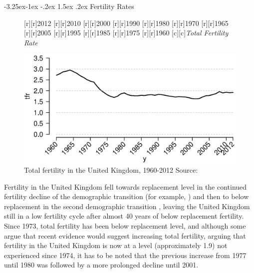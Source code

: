 \documentclass[11 pt, a4paper]{report}
\makeatletter
\renewcommand\subsection{\@startsection{subsection}{2}{\z@}%
                                     {-3.25ex\@plus -1ex \@minus -.2ex}%
                                     {1.5ex \@plus .2ex}%
    								{\large\scshape}}
\makeatother
\begin{document}
\clearpage
\subsection{Fertility Rates}

\begin{figure}[hbtp!]
[r][r]{\small{2012}}
[r][r]{\small{2010}}
[r][r]{\small{2000}}
[r][r]{\small{1990}}
[r][r]{\small{1980}}
[r][r]{\small{1970}}
[r][r]{\small{1965}}
[r][r]{\small{2005}}
[r][r]{\small{1995}}
[r][r]{\small{1985}}
[r][r]{\small{1975}}
[r][r]{\small{1960}}
[c][c]{\normalsize{\emph{Total Fertility Rate}}}

\includegraphics[width=\textwidth]{../figures/Fig1.2.eps}
\caption{Total fertility in the United Kingdom, 1960-2012 Source: \citet{ONS2014}}
\label{Fig:03}
\end{figure}

Fertility in the United Kingdom fell towards replacement level in the continued fertility decline of the demographic transition (for example, \cite{Kirk1996}) and then to below replacement in the second demographic transition \citep{vdKaa1987}, leaving the United Kingdom still in a low fertility cycle after almost 40 years of below replacement fertility. Since 1973, total fertility has been below replacement level, and although some argue that recent evidence would suggest increasing total fertility, arguing that fertility in the United Kingdom is now at a level (approximately 1.9) not experienced since 1974, it has to be noted that the previous increase from 1977 until 1980 was followed by a more prolonged decline until 2001. 
\end{document}
